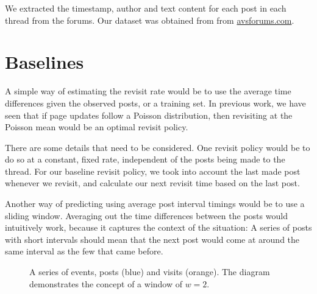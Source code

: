 We extracted the timestamp, author and text content for each post in each thread
from the forums. Our dataset was obtained from from \url{avsforums.com}.
%
%

\section{Baselines}
A simple way of estimating the revisit rate would be to use the average time 
differences given the observed posts, or a training set. In previous work, we 
have seen that if page updates follow a Poisson distribution, then revisiting at 
the Poisson mean would be an optimal revisit policy. %

There are some details that need to be considered. One revisit policy would be 
to do so at a constant, fixed rate, independent of the posts being made to the 
thread. For our baseline revisit policy, we took into account the last made post 
whenever we revisit, and calculate our next revisit time based on the last post.

Another way of predicting using average post interval timings would be to use a 
sliding window. Averaging out the time differences between the posts would 
intuitively work, because it captures the context of the situation: A series of 
posts with short intervals should mean that the next post would come at around 
the same interval as the few that came before.


\begin{figure}
	\begin{center}
	
	\caption{%
A series of events, posts (blue) and visits (orange).  The diagram demonstrates 
the concept of a window of $w=2$.
}\label{fig:event_series}
	\end{center}
\end{figure}

